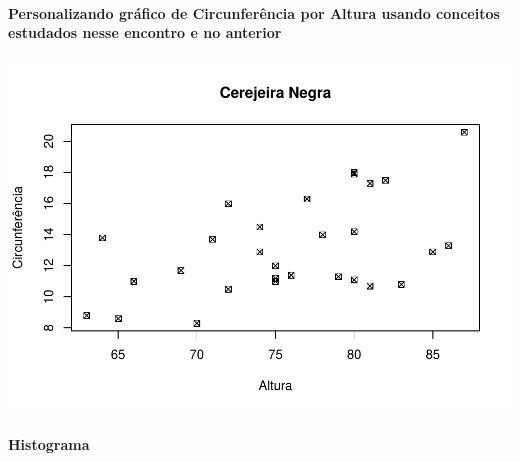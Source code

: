 \documentclass[
]{article}
\newenvironment{Shaded}{\begin{snugshade}}{\end{snugshade}}
\newcommand{\AttributeTok}[1]{\textcolor[rgb]{0.77,0.63,0.00}{#1}}
\newcommand{\DecValTok}[1]{\textcolor[rgb]{0.00,0.00,0.81}{#1}}
\newcommand{\FunctionTok}[1]{\textcolor[rgb]{0.00,0.00,0.00}{#1}}
\newcommand{\NormalTok}[1]{#1}
\newcommand{\SpecialCharTok}[1]{\textcolor[rgb]{0.00,0.00,0.00}{#1}}
\newcommand{\StringTok}[1]{\textcolor[rgb]{0.31,0.60,0.02}{#1}}
\begin{document}
\hypertarget{personalizando-gruxe1fico-de-circunferuxeancia-por-altura-usando-conceitos-estudados-nesse-encontro-e-no-anterior}{%
\paragraph{Personalizando gráfico de Circunferência por Altura usando
conceitos estudados nesse encontro e no
anterior}\label{personalizando-gruxe1fico-de-circunferuxeancia-por-altura-usando-conceitos-estudados-nesse-encontro-e-no-anterior}}

\begin{Shaded}
\end{Shaded}

\includegraphics{presencial_função_plot_04_turma_B_files/figure-latex/unnamed-chunk-14-1.pdf}

\hypertarget{histograma}{%
\paragraph{Histograma}\label{histograma}}
\end{document}
